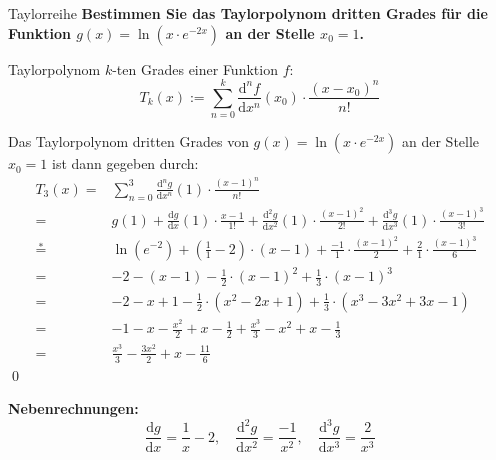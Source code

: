 \documentclass[german]{../spicker}
\begin{document}
\begin{example}{Taylorreihe}
    \textbf{Bestimmen Sie das Taylorpolynom dritten Grades für die Funktion $g(x) = \ln(x\cdot e^{-2x})$ an der Stelle $x_0 = 1$.}

    Taylorpolynom $k$-ten Grades einer Funktion $f$:
    $$T_k(x) := \sum_{n=0}^k \frac{\mathrm{d}^n f}{\mathrm{d}x^n} (x_0)\cdot\frac{(x-x_0)^n}{n!} $$

    Das Taylorpolynom dritten Grades von $g(x) = \ln(x\cdot e^{-2x})$ an der Stelle $x_0 = 1$ ist dann gegeben durch:
    $$
        \begin{aligned}
            T_3(x) ={}      & \sum_{n=0}^3 \frac{\mathrm{d}^n g}{\mathrm{d}x^n} (1)\cdot\frac{(x-1)^n}{n!}                                                                                                                       \\
            ={}             & g(1) + \frac{\mathrm{d} g}{\mathrm{d} x}(1)\cdot\frac{x-1}{1!} + \frac{\mathrm{d^2} g}{\mathrm{d} x^2}(1)\cdot\frac{(x-1)^2}{2!} + \frac{\mathrm{d^3} g}{\mathrm{d} x^3}(1)\cdot\frac{(x-1)^3}{3!} \\
            \stackrel{*}={} & \ln(e^{-2}) + \left( \frac{1}{1}- 2 \right)\cdot(x-1) + \frac{-1}{1}\cdot\frac{(x-1)^2}{2} + \frac{2}{1}\cdot\frac{(x-1)^3}{6}                                                                     \\
            ={}             & -2 -(x-1) - \frac{1}{2}\cdot (x-1)^2 +\frac{1}{3}\cdot (x-1)^3                                                                                                                                     \\
            ={}             & -2 -x+1 - \frac{1}{2}\cdot (x^2-2x+1) +\frac{1}{3}\cdot (x^3 -3x^2+3x-1)                                                                                                                           \\
            ={}             & -1 -x - \frac{x^2}{2} + x -\frac{1}{2} +\frac{x^3}{3} - x^2 + x -\frac{1}{3}                                                                                                                       \\
            ={}             & \frac{x^3}{3}- \frac{3x^2}{2} + x - \frac{11}{6}
        \end{aligned}
    $$
    \qed

    \vspace{2em}

    \textbf{Nebenrechnungen:}
    $$
        \frac{\mathrm{d} g}{\mathrm{d} x} = \frac{1}{x} - 2, \quad
        \frac{\mathrm{d}^2 g}{\mathrm{d} x^2} = \frac{-1}{x^2}, \quad
        \frac{\mathrm{d}^3 g}{\mathrm{d} x^3} = \frac{2}{x^3}
    $$
\end{example}
\end{document}
